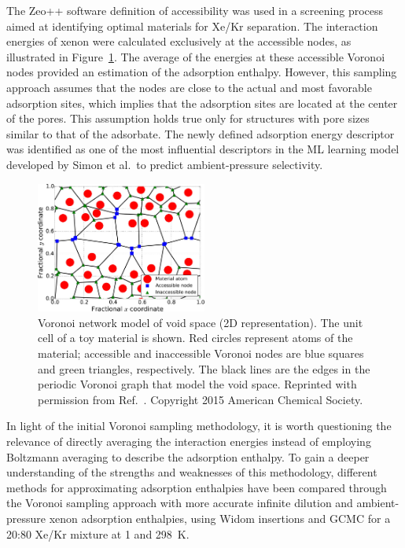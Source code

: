 \documentclass[main]{subfiles}
\begin{document}
The Zeo++ software definition of accessibility was used in a screening process aimed at identifying optimal materials for Xe/Kr separation.\autocite{Simon_2015} The interaction energies of xenon were calculated exclusively at the accessible nodes, as illustrated in Figure~\ref{fgr:simon_voro}. The average of the energies at these accessible Voronoi nodes provided an estimation of the adsorption enthalpy. However, this sampling approach assumes that the nodes are close to the actual and most favorable adsorption sites, which implies that the adsorption sites are located at the center of the pores. This assumption holds true only for structures with pore sizes similar to that of the adsorbate. The newly defined adsorption energy descriptor was identified as one of the most influential descriptors in the ML learning model developed by Simon et al.\ to predict ambient-pressure selectivity.

\begin{figure}[ht]
  \centering
  \includegraphics[width=0.5\textwidth]{figures/3-fastsim/Simon_voronoi.jpeg}
  \caption{Voronoi network model of void space (2D representation). The unit cell of a toy material is shown. Red circles represent atoms of the material; accessible and inaccessible Voronoi nodes are blue squares and green triangles, respectively. The black lines are the edges in the periodic Voronoi graph that model the void space. Reprinted with permission from Ref.~\cite{Simon_2015}. Copyright 2015 American Chemical Society.}\label{fgr:simon_voro}
\end{figure}

In light of the initial Voronoi sampling methodology, it is worth questioning the relevance of directly averaging the interaction energies instead of employing Boltzmann averaging to describe the adsorption enthalpy. To gain a deeper understanding of the strengths and weaknesses of this methodology, different methods for approximating adsorption enthalpies have been compared through the Voronoi sampling approach with more accurate infinite dilution and ambient-pressure xenon adsorption enthalpies, using Widom insertions and GCMC for a 20:80 Xe/Kr mixture at \SI{1}{\atm} and \SI{298}{\kelvin}.
\end{document}
